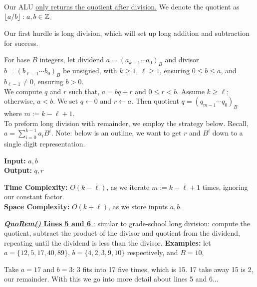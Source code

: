 \newpage
\begin{Def}

    Our ALU  \underline{only returns the quotient after division.} We denote the quotient as $\floor*{a/b}:a,b\in\Z$.
\end{Def}
\noindent
Our first hurdle is long division, which will set up long addition and subtraction for success.
\begin{Func}

    For base $B$ integers, let dividend $a = (a_{k-1} \cdots a_0)_B$ and divisor $b = (b_{\ell-1} \cdots b_0)_B$ be unsigned, with $k \geq 1$,
    $\ell \geq 1$, ensuring $0\leq b\leq a$, and $b_{\ell-1} \neq 0$, ensuring $b>0$.\\ 
    
    \noindent
    We compute $q$ and $r$ such that, $a = bq + r$ and $0 \leq r < b$. 
    Assume $k \geq \ell$; otherwise, $a < b$. We set $q \gets 0$ and $r \gets a$. 
    Then quotient $q = (q_{m-1} \cdots q_0)_B$ where $m := k - \ell + 1$.\\

    \noindent
    To preform long division with remainder, we employ the strategy below. Recall, $a=\sum_{i=0}^{k-1}a_iB^i$.
    Note: below is an outline, we want to get $r$ and $B^i$ down to a single digit representation.

    \vspace{.5em}
    \noindent
    \textbf{Input:} $a, b$\\
    \noindent
    \textbf{Output:} $q, r$\\
    \begin{algorithm}[H]
        \SetAlgoLined
    \end{algorithm}

    \noindent
    \textbf{Time Complexity:} $O(k-\ell)$, as we iterate $m := k - \ell + 1$ times, ignoring our constant factor.\\
    \textbf{Space Complexity:} $O(k+\ell)$, as we store inputs $a, b$.
\end{Func}
\noindent
\underline{\textbf{\textit{QuoRem()} Lines 5 and 6 }:} similar to grade-school long division: compute the quotient, subtract the product of the divisor and quotient from the dividend, repeating until the dividend is less than the divisor.
\textbf{Examples:} let $a=\{12,5,17,40,89\}$, $b=\{4,2,3,9,10\}$ respectively, and $B=10$,
\begin{center}
        
\end{center}
\noindent
Take $a=17$ and $b=3$: 3 fits into 17 five times, which is 15. 17 take away 15 is 2, our remainder.
With this we go into more detail about lines 5 and 6...

